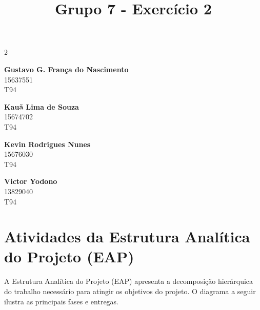 \documentclass[a4paper]{article}
\title{
    \textbf{Grupo 7 - Exercício 2}
}
\date{}
\begin{document}
\maketitle
\vspace{-1.5cm}
\thispagestyle{firstpage}


\begin{multicols}{2}
    \centering

    \textbf{Gustavo G. França do Nascimento}\\
    15637551\\
    T94
    
    \vspace{0.5cm}
    
    \textbf{Kauã Lima de Souza}\\
    15674702\\
    T94
    
    \vspace{0.5cm}

    \textbf{Kevin Rodrigues Nunes}\\
    15676030\\
    T94
    
    \vspace{0.5cm}
    
    \textbf{Victor Yodono}\\
    13829040\\
    T94

\end{multicols}

\vspace{-0.2cm} %


\singlespacing
\setlength{\parskip}{6pt}
\setlength{\parindent}{0.5cm}

\section{Atividades da Estrutura Analítica do Projeto (EAP)}

A Estrutura Analítica do Projeto (EAP) apresenta a decomposição hierárquica do trabalho necessário para atingir os objetivos do projeto. O diagrama a seguir ilustra as principais fases e entregas.
\end{document}
